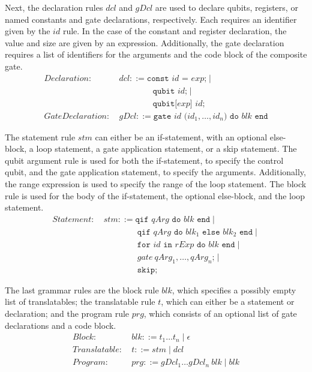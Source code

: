 Next, the declaration rules $dcl$ and $gDcl$ are used to declare qubits, registers, or named constants and gate declarations, respectively. Each requires an identifier given by the $id$ rule. In the case of the constant and register declaration, the value and size are given by an expression. Additionally, the gate declaration requires a list of identifiers for the arguments and the code block of the composite gate.
\begin{align*}
    Declaration: \ & dcl ::= \texttt{const } id \texttt{ = } exp \texttt{;} \mid \\
                 & \quad \quad \quad \quad \texttt{qubit } id \texttt{;} \mid \\
                 & \quad \quad \quad \quad \texttt{qubit[} exp \texttt{] } id \texttt{;}\\
    GateDeclaration: \ & gDcl::= \texttt{gate } id \texttt{ (}id_1, \dots, id_n\texttt{) do } blk \texttt{ end}
\end{align*}

The statement rule $stm$ can either be an if-statement, with an optional else-block, a loop statement, a gate application statement, or a skip statement. The qubit argument rule is used for both the if-statement, to specify the control qubit, and the gate application statement, to specify the arguments. Additionally, the range expression is used to specify the range of the loop statement. The block rule is used for the body of the if-statement, the optional else-block, and the loop statement.
\begin{align*}
    Statement: \ & stm ::= \texttt{qif } qArg \texttt{ do }  blk \texttt{ end} \mid\\
                 & \quad \quad \quad \quad \texttt{qif } qArg \texttt{ do }  blk_1 \texttt{ else } blk_2 \texttt{ end} \mid\\
                 & \quad \quad \quad \quad \texttt{for } id \texttt{ in } rExp \texttt{ do } blk \texttt{ end} \mid \\
                 & \quad \quad \quad \quad gate \ qArg_1, \dots, qArg_n \texttt{;} \mid \\
                 & \quad \quad \quad \quad \texttt{skip;}
\end{align*}

The last grammar rules are the block rule $blk$, which specifies a possibly empty list of translatables; the translatable rule $t$, which can either be a statement or declaration; and the program rule $prg$, which consists of an optional list of gate declarations and a code block.
\begin{align*}
    Block: \ & blk::= t_1 \dots t_n \mid \epsilon\\
    Translatable : \ & t::= stm \mid dcl\\
    Program: \ & prg ::= gDcl_1 \dots gDcl_n \ blk \mid blk 
\end{align*}

